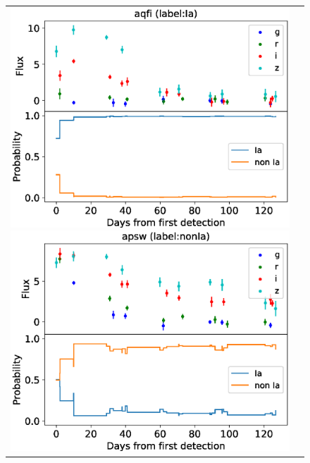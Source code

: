 \documentclass[useamsfonts]{pasj01}
\begin{document}
%
%
\begin{figure}[ht]
    \begin{tabular}{cc}
        \begin{minipage}{0.32\hsize}
            \begin{center}
                \includegraphics[width=\columnwidth]{figures/lcp_aqfi.eps}
            \end{center}
        \end{minipage}
        \begin{minipage}{0.32\hsize}
            \begin{center}
                \includegraphics[width=\columnwidth]{figures/lcp_apsw.eps}

\end{center}
\end{minipage}
\end{tabular}
\end{figure}
\end{document}
